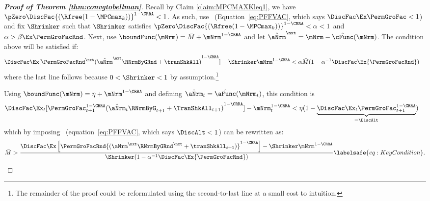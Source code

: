 \documentclass[\econtexRoot/BufferStockTheory]{subfiles}
\begin{document}
\begin{proof}[\textbf{Proof of Theorem \ref{thm:convgtobellman}}]
Recall by Claim \ref{claim:MPCMAXKleq1}, we have $\pZero \DiscFac {(\Rfree (1-\MPCmax_{k}))}^{1-\CRRA}   < 1$.
As such, use \FVAC~(Equation~\eqref{eq:PFFVAC}, which says $\DiscFac\Ex\PermGroFac<1$) and fix $\Shrinker$ such that $\Shrinker$ satisfies $\pZero \DiscFac {(\Rfree (1-\MPCmax_{k}))}^{1-\CRRA} < \alpha < 1$ and $\alpha> \beta\Ex\PermGroFacRnd$.
Next, use $\boundFunc(\mNrm)= \bar{M} + \mNrm^{1-\CRRA}$ and let $\hat{\aNrm}^{\nxt} = \mNrm - \hat{\cFunc}(\mNrm)$.
The condition above will be satisfied if:
%
%
\begin{align*}
  \DiscFac \Ex [{\PermGroFacRnd}^{\nxt}{(\hat{\aNrm}^{\nxt}\RNrmByGRnd+\tranShkAll)}^{1-\CRRA}]-\Shrinker\mNrm^{1-\CRRA}  & < \alpha\bar{M}(1-\alpha^{-1}\DiscFac\Ex {\PermGroFacRnd})
\end{align*}
where the last line follows because $0 < \Shrinker < 1$ by assumption.\footnote{The remainder of the proof could be reformulated using the second-to-last line at a small cost to intuition.}

Using $\boundFunc(\mNrm)= \eta + \mNrm^{1-\CRRA}$
and defining $\hat{\aNrm}_{t}=\hat{\aFunc}(\mNrm_{t})$, this condition is
\begin{align*}
  \DiscFac \Ex_{t}[{\PermGroFac}_{t+1}^{1-\CRRA}{(\hat{\aNrm}_{t}\RNrmByG_{t+1}+\TranShkAll_{t+1})}^{1-\CRRA}]-\mNrm_{t}^{1-\CRRA}  & < \eta(1-\underbrace{\DiscFac\Ex_{t}{\PermGroFac}_{t+1}^{1-\CRRA}}_{=\DiscAlt})
\end{align*}
which by imposing \PFFVAC~(equation~\eqref{eq:PFFVAC}, which says $\DiscAlt<1$) can be rewritten as:
\begin{equation}\begin{gathered}\begin{aligned}
      \bar{M}>\frac{\DiscFac \Ex\left[\PermGroFacRnd{(\aNrm^{\nxt}\RNrmByGRnd^{\nxt} +\tranShkAll_{t+1})}^{1-\CRRA}\right]- \Shrinker\mNrm^{1-\CRRA}}{\Shrinker(1-\alpha^{-1}\DiscFac\Ex {\PermGroFacRnd})}\labelsafe{eq:KeyCondition}.
    \end{aligned}\end{gathered}\end{equation}


\end{proof}
\end{document}

